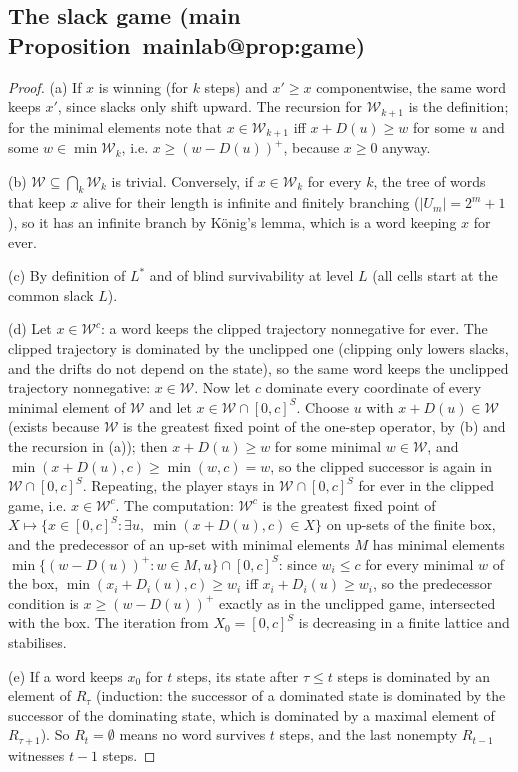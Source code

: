 \documentclass[11pt,a4paper]{article}
\makeatletter
\theoremstyle{plain}
\theoremstyle{definition}
\theoremstyle{remark}
\newcommand{\calW}{\mathcal{W}}
\newcommand{\Lstar}{L^{\ast}}
\newcommand{\mref}[1]{\csname mainlab@#1\endcsname}
\makeatother
\begin{document}
\subsection{The slack game (main Proposition~\mref{prop:game})}
\begin{proof}
(a) If $x$ is winning (for $k$ steps) and $x'\ge x$ componentwise, the same word keeps $x'$, since slacks only shift upward. The recursion for $\calW_{k+1}$ is the definition; for the minimal elements note that $x\in\calW_{k+1}$ iff $x+D(u)\ge w$ for some $u$ and some $w\in\min\calW_k$, i.e. $x\ge(w-D(u))^+$, because $x\ge0$ anyway.

(b) $\calW\subseteq\bigcap_k\calW_k$ is trivial. Conversely, if $x\in\calW_k$ for every $k$, the tree of words that keep $x$ alive for their length is infinite and finitely branching ($|U_m|=2^m+1$), so it has an infinite branch by K\"onig's lemma, which is a word keeping $x$ for ever.

(c) By definition of $\Lstar$ and of blind survivability at level $L$ (all cells start at the common slack $L$).

(d) Let $x\in\calW^{c}$: a word keeps the clipped trajectory nonnegative for ever. The clipped trajectory is dominated by the unclipped one (clipping only lowers slacks, and the drifts do not depend on the state), so the same word keeps the unclipped trajectory nonnegative: $x\in\calW$. Now let $c$ dominate every coordinate of every minimal element of $\calW$ and let $x\in\calW\cap[0,c]^S$. Choose $u$ with $x+D(u)\in\calW$ (exists because $\calW$ is the greatest fixed point of the one-step operator, by (b) and the recursion in (a)); then $x+D(u)\ge w$ for some minimal $w\in\calW$, and $\min(x+D(u),c)\ge\min(w,c)=w$, so the clipped successor is again in $\calW\cap[0,c]^S$. Repeating, the player stays in $\calW\cap[0,c]^S$ for ever in the clipped game, i.e. $x\in\calW^{c}$. The computation: $\calW^{c}$ is the greatest fixed point of $X\mapsto\{x\in[0,c]^S:\exists u,\ \min(x+D(u),c)\in X\}$ on up-sets of the finite box, and the predecessor of an up-set with minimal elements $M$ has minimal elements $\min\{(w-D(u))^+:w\in M,u\}\cap[0,c]^S$: since $w_i\le c$ for every minimal $w$ of the box, $\min(x_i+D_i(u),c)\ge w_i$ iff $x_i+D_i(u)\ge w_i$, so the predecessor condition is $x\ge(w-D(u))^+$ exactly as in the unclipped game, intersected with the box. The iteration from $X_0=[0,c]^S$ is decreasing in a finite lattice and stabilises.

(e) If a word keeps $x_0$ for $t$ steps, its state after $\tau\le t$ steps is dominated by an element of $R_\tau$ (induction: the successor of a dominated state is dominated by the successor of the dominating state, which is dominated by a maximal element of $R_{\tau+1}$). So $R_t=\emptyset$ means no word survives $t$ steps, and the last nonempty $R_{t-1}$ witnesses $t-1$ steps.
\end{proof}
\end{document}
